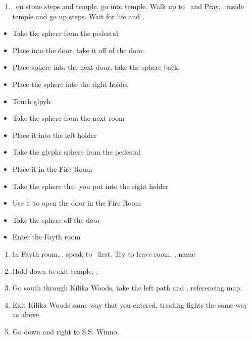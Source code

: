 \begin{enumerate}[resume]
	\item \sd\ on stone steps and temple. go into temple. Walk up to \wakka\ and Pray. \sd\ inside temple and go up steps. Wait for life and \sd.
\end{enumerate}
\begin{trial}
	\begin{itemize}
		\item Take the sphere from the pedestal
		\item Place into the door, take it off of the door.
		\item Place sphere into the next door, take the sphere back.
		\item Place the sphere into the right holder
		\item Touch glpyh
		\item Take the sphere from the next room
		\item Place it into the left holder
		\item Take the glyphs sphere from the pedestal
		\item Place it in the Fire Room
		\item Take the sphere that you put into the right holder
		\item Use it to open the door in the Fire Room
		\item Take the sphere off the door
		\item Enter the Fayth room
	\end{itemize}
\end{trial}
\begin{enumerate}[resume]
	\item In Fayth room, \sd, speak to \wakka\ first. Try to leave room, \sd, name \ifrit
	\item Hold down to exit temple, \cs[0:40], \sd
	\item Go south through Kilika Woods, take the left path and , referencing map.
	\item Exit Kilika Woods same way that you entered, treating fights the same way as above.
	\item Go down and right to S.S. Winno. \sd
\end{enumerate}
	